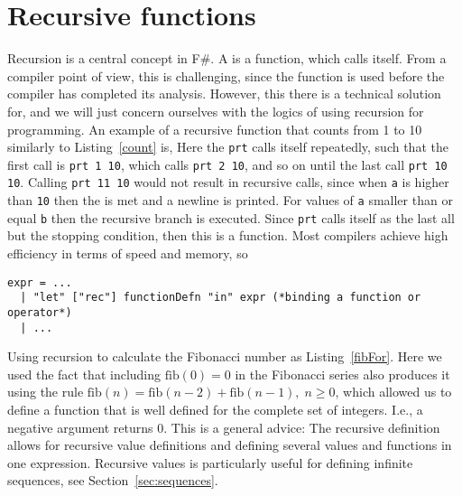 \section{Recursive functions}
Recursion is a central concept in F\#. A  is a function, which calls itself. From a compiler point of view, this is challenging, since the function is used before the compiler has completed its analysis. However, this there is a technical solution for, and we will just concern ourselves with the logics of using recursion for programming. An example of a recursive function that counts from 1 to 10 similarly to Listing~\ref{count} is,
%
%
Here the \lstinline!prt! calls itself repeatedly, such that the first call is \lstinline!prt 1 10!, which calls \lstinline!prt 2 10!, and so on until the last call \lstinline!prt 10 10!. Calling \lstinline!prt 11 10! would not result in recursive calls, since when \lstinline!a! is higher than \lstinline!10! then the  is met and a newline is printed. For values of \lstinline!a! smaller than or equal \lstinline!b! then the recursive branch is executed. Since \lstinline!prt! calls itself as the last all but the stopping condition, then this is a  function. Most compilers achieve high efficiency in terms of speed and memory, so 
\begin{lstlisting}[language=ebnf]
expr = ... 
  | "let" ["rec"] functionDefn "in" expr (*binding a function or operator*)
  | ...
\end{lstlisting}
Using recursion to calculate the Fibonacci number as Listing~\ref{fibFor}.
%
%
Here we used the fact that including $\text{fib}(0)=0$ in the Fibonacci series also produces it using the rule $\text{fib}(n)=\text{fib}(n-2)+\text{fib}(n-1),\; n\geq 0$, which allowed us to define a function that is well defined for the complete set of integers. I.e., a negative argument returns 0. This is a general advice:  The recursive definition allows for recursive value definitions and defining several values and functions in one expression. Recursive values is particularly useful for defining infinite sequences, see Section~\ref{sec:sequences}.




